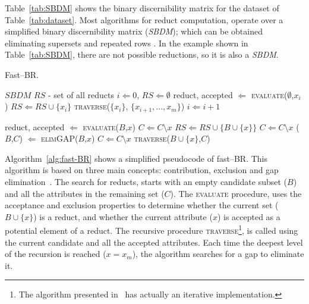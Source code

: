 \documentclass[citenumber]{elsarticle}
\renewcommand{\algorithmicrequire}{\textbf{Input:}}
\renewcommand{\algorithmicensure}{\textbf{Output:}}
\begin{document}
 Table~\ref{tab:SBDM} shows the binary discernibility matrix for the dataset of Table~\ref{tab:dataset}. Most algorithms for reduct computation, operate over a simplified binary discernibility matrix (\textit{SBDM}); which can be obtained eliminating supersets and repeated rows \cite{Yao09}. In the example shown in Table~\ref{tab:SBDM}, there are not possible reductions, so it is also a \textit{SBDM}.
 
 	\renewcommand{\algorithmicrequire}{\textbf{Input:}}
 	\renewcommand{\algorithmicensure}{\textbf{Output:}}
 	\begin{algorithm} \label{alg:fast-BR}
 		\footnotesize
 		\caption{Fast--BR.}
 		\label{alg:RSDM}
 		\begin{multicols}{2}
 			\begin{algorithmic}[1]
 				\Require $SBDM$
 				\Ensure $RS$ - set of all reducts
 				\State $i \Leftarrow 0$, $RS \Leftarrow \emptyset$
 				\State reduct, accepted $\Leftarrow$ \textsc{evaluate}($\emptyset$,$x_i$)
 				\State $RS \Leftarrow RS\cup\lbrace x_i \rbrace$
 				\Else
 				\State \textsc{traverse}($\lbrace x_i \rbrace$, $\lbrace x_{i+1},..., x_m\rbrace$)
 				\EndIf
 				\State $i \Leftarrow i+1$
 				\EndWhile
 				
 				\State reduct, accepted $\Leftarrow$ \textsc{evaluate}($B$,$x$)
 				\State $C \Leftarrow C\setminus x$
 				\State $RS \Leftarrow RS\cup\lbrace B\cup \lbrace x\rbrace \rbrace$
 				\Else
 				\State $C \Leftarrow C\setminus x$
 				\EndIf
 				\EndIf
 				\EndFor
 				\State ($B$,$C$) $\Leftarrow$ \textsc{elimGAP}($B$,$x$)
 				\EndIf
 				\State $C \Leftarrow C\setminus x$
 				\State \textsc{traverse}($B\cup \lbrace x\rbrace$,$C$)
 				\EndFor
 				\EndProcedure
 			\end{algorithmic}
 		\end{multicols}
 	\end{algorithm}    
 
 Algorithm~\ref{alg:fast-BR} shows a simplified pseudocode of fast--BR. This algorithm is based on three main concepts: contribution, exclusion and gap elimination~\cite{Lias13}. The search for reducts, starts with an empty candidate subset ($B$) and all the attributes in the remaining set ($C$). The \textsc{evaluate} procedure, uses the acceptance and exclusion properties to determine whether the current set ($B\cup \lbrace x\rbrace$) is a reduct, and whether the current attribute ($x$) is accepted as a potential element of a reduct. The recursive procedure \textsc{traverse}\footnote{The algorithm presented in~\cite{Lias13} has actually an iterative implementation.}, is called using the current candidate and all the accepted attributes. Each time the deepest level of the recursion is reached ($x=x_m$), the algorithm searches for a gap to eliminate it.
 
\end{document}
